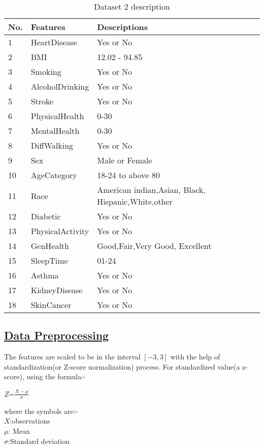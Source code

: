 \documentclass[11pt]{article}
\begin{document}
\begin{table}[!ht]
    \caption{Dataset 2 description}

    \centering
    \begin{tabular}{|l|l|l|}
    \hline
        No. & Features & Descriptions \\ \hline
        1 & HeartDisease & Yes or No \\ \hline
        2 & BMI & 12.02 - 94.85 \\ \hline
        3 & Smoking & Yes or No \\ \hline
        4 & AlcoholDrinking & Yes or No \\ \hline
        5 & Stroke & Yes or No \\ \hline
        6 & PhysicalHealth & 0-30 \\ \hline
        7 & MentalHealth & 0-30 \\ \hline
        8 & DiffWalking & Yes or No \\ \hline
        9 & Sex & Male or Female \\ \hline
        10 & AgeCategory & 18-24 to above 80 \\ \hline
        11 & Race & American indian,Asian, Black, Hispanic,White,other \\ \hline
        12 & Diabetic & Yes or No \\ \hline
        13 & PhysicalActivity & Yes or No \\ \hline
        14 & GenHealth & Good,Fair,Very Good, Excellent \\ \hline
        15 & SleepTime & 01-24 \\ \hline
        16 & Asthma & Yes or No \\ \hline
        17 & KidneyDisease & Yes or No \\ \hline
        18 & SkinCancer & Yes or No \\ \hline
    \end{tabular}
    \label{tab:data2}
\end{table}
\clearpage
\subsection{\underline{Data Preprocessing}}
The features are scaled to be in the interval $[-3,3]$ with the help of standardization(or Z-score normalization) process. For standardized value(a z-score), using the formula:-
\begin{center}
$Z$=$\displaystyle\frac{X-\mu}{\sigma}$
\end{center}
where the symbols are:-\\
$X$:observations\\
$\mu$: Mean\\
$\sigma$:Standard deviation
\end{document}
